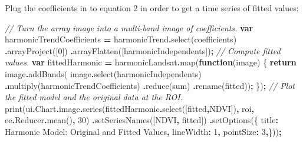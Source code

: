 \documentclass[
]{article}
\newenvironment{Shaded}{\begin{snugshade}}{\end{snugshade}}
\newcommand{\AttributeTok}[1]{\textcolor[rgb]{0.77,0.63,0.00}{#1}}
\newcommand{\CommentTok}[1]{\textcolor[rgb]{0.56,0.35,0.01}{\textit{#1}}}
\newcommand{\ControlFlowTok}[1]{\textcolor[rgb]{0.13,0.29,0.53}{\textbf{#1}}}
\newcommand{\DataTypeTok}[1]{\textcolor[rgb]{0.13,0.29,0.53}{#1}}
\newcommand{\DecValTok}[1]{\textcolor[rgb]{0.00,0.00,0.81}{#1}}
\newcommand{\FunctionTok}[1]{\textcolor[rgb]{0.00,0.00,0.00}{#1}}
\newcommand{\KeywordTok}[1]{\textcolor[rgb]{0.13,0.29,0.53}{\textbf{#1}}}
\newcommand{\NormalTok}[1]{#1}
\newcommand{\OperatorTok}[1]{\textcolor[rgb]{0.81,0.36,0.00}{\textbf{#1}}}
\newcommand{\StringTok}[1]{\textcolor[rgb]{0.31,0.60,0.02}{#1}}
\begin{document}
Plug the coefficients in to equation 2 in order to get a time series of fitted values:

\begin{Shaded}
\begin{Highlighting}[]
\CommentTok{// Turn the array image into a multi{-}band image of coefficients.}
\KeywordTok{var}\NormalTok{ harmonicTrendCoefficients }\OperatorTok{=}\NormalTok{ harmonicTrend}\OperatorTok{.}\FunctionTok{select}\NormalTok{(}\StringTok{\textquotesingle{}coefficients\textquotesingle{}}\NormalTok{) }
        \OperatorTok{.}\FunctionTok{arrayProject}\NormalTok{([}\DecValTok{0}\NormalTok{])              }
        \OperatorTok{.}\FunctionTok{arrayFlatten}\NormalTok{([harmonicIndependents])}\OperatorTok{;}
\CommentTok{// Compute fitted values.}
\KeywordTok{var}\NormalTok{ fittedHarmonic }\OperatorTok{=}\NormalTok{ harmonicLandsat}\OperatorTok{.}\FunctionTok{map}\NormalTok{(}\KeywordTok{function}\NormalTok{(image) \{ }
  \ControlFlowTok{return}\NormalTok{ image}\OperatorTok{.}\FunctionTok{addBands}\NormalTok{(  }
\NormalTok{  image}\OperatorTok{.}\FunctionTok{select}\NormalTok{(harmonicIndependents)   }
  \OperatorTok{.}\FunctionTok{multiply}\NormalTok{(harmonicTrendCoefficients)   }
  \OperatorTok{.}\FunctionTok{reduce}\NormalTok{(}\StringTok{\textquotesingle{}sum\textquotesingle{}}\NormalTok{)   }
  \OperatorTok{.}\FunctionTok{rename}\NormalTok{(}\StringTok{\textquotesingle{}fitted\textquotesingle{}}\NormalTok{))}\OperatorTok{;}
\NormalTok{\})}\OperatorTok{;}
\CommentTok{// Plot the fitted model and the original data at the ROI.}
\FunctionTok{print}\NormalTok{(ui}\OperatorTok{.}\AttributeTok{Chart}\OperatorTok{.}\AttributeTok{image}\OperatorTok{.}\FunctionTok{series}\NormalTok{(fittedHarmonic}\OperatorTok{.}\FunctionTok{select}\NormalTok{([}\StringTok{\textquotesingle{}fitted\textquotesingle{}}\OperatorTok{,}\StringTok{\textquotesingle{}NDVI\textquotesingle{}}\NormalTok{])}\OperatorTok{,}\NormalTok{ roi}\OperatorTok{,}
\NormalTok{                  ee}\OperatorTok{.}\AttributeTok{Reducer}\OperatorTok{.}\FunctionTok{mean}\NormalTok{()}\OperatorTok{,} \DecValTok{30}\NormalTok{)  }
  \OperatorTok{.}\FunctionTok{setSeriesNames}\NormalTok{([}\StringTok{\textquotesingle{}NDVI\textquotesingle{}}\OperatorTok{,} \StringTok{\textquotesingle{}fitted\textquotesingle{}}\NormalTok{])  }
  \OperatorTok{.}\FunctionTok{setOptions}\NormalTok{(\{   }
  \DataTypeTok{title}\OperatorTok{:} \StringTok{\textquotesingle{}Harmonic Model: Original and Fitted Values\textquotesingle{}}\OperatorTok{,}   
  \DataTypeTok{lineWidth}\OperatorTok{:} \DecValTok{1}\OperatorTok{,}   
  \DataTypeTok{pointSize}\OperatorTok{:} \DecValTok{3}\OperatorTok{,}\NormalTok{\}))}\OperatorTok{;}
\end{Highlighting}
\end{Shaded}
\end{document}

